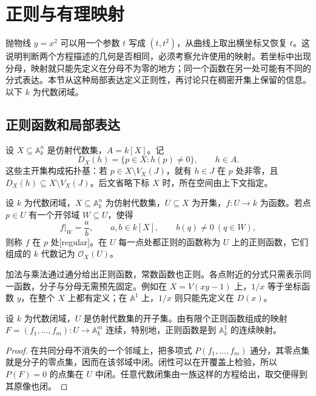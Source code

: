 
% 
% 

\section{正则与有理映射}
\label{g5:sec:0102}

抛物线 \(y=x^2\) 可以用一个参数 \(t\) 写成 \((t,t^2)\)，从曲线上取出横坐标又恢复 \(t\)。这说明判断两个方程描述的几何是否相同，必须考察允许使用的映射。若坐标中出现分母，映射就只能先定义在分母不为零的地方；同一个函数在另一处可能有不同的分式表达。本节从这种局部表达定义正则性，再讨论只在稠密开集上保留的信息。以下 \(k\) 为代数闭域。

\subsection{正则函数和局部表达}
\label{g5:subsec:0102:01}

设 \(X\subseteq\mathbb A_k^n\) 是仿射代数集，\(A=k[X]\)。记
\[
	D_X(h)=\{p\in X:h(p)\ne0\},\qquad h\in A.
\]
这些主开集构成拓扑基：若 \(p\in X\setminus V_X(J)\)，就有 \(h\in J\) 在 \(p\) 处非零，且 \(D_X(h)\subseteq X\setminus V_X(J)\)。后文省略下标 \(X\) 时，所在空间由上下文指定。

\begin{definition}\label{g5:def:regular-function}
	设 \(k\) 为代数闭域，\(X\subseteq\mathbb A_k^n\) 为仿射代数集，\(U\subseteq X\) 为开集，\(f:U\rightarrow k\) 为函数。若点 \(p\in U\) 有一个开邻域 \(W\subseteq U\)，使得
	\[
		f|_W=\frac ab,\qquad a,b\in k[X],\qquad b(q)\ne0\ (q\in W),
	\]
	则称 \(f\) 在 \(p\) 处[regular]。在 \(U\) 每一点处都正则的函数称为 \(U\) 上的正则函数，它们组成的 \(k\) 代数记为 \(\mathcal O_X(U)\)。
\end{definition}

加法与乘法通过通分给出正则函数，常数函数也正则。各点附近的分式只需表示同一函数，分子与分母无需预先固定。例如在 \(X=V(xy-1)\) 上，\(1/x\) 等于坐标函数 \(y\)，在整个 \(X\) 上都有定义；在 \(\mathbb A^1\) 上，\(1/x\) 则只能先定义在 \(D(x)\)。

\begin{proposition}\label{g5:prop:regular-continuous}
	设 \(k\) 为代数闭域，\(U\) 是仿射代数集的开子集。由有限个正则函数组成的映射 \(F=(f_1,\ldots,f_m):U\rightarrow\mathbb A_k^m\) 连续，特别地，正则函数是到 \(\mathbb A_k^1\) 的连续映射。
\end{proposition}
\begin{proof}
	在共同分母不消失的一个邻域上，把多项式 \(P(f_1,\ldots,f_m)\) 通分，其零点集就是分子的零点集，因而在该邻域中闭。闭性可以在开覆盖上检验，所以 \(P(F)=0\) 的点集在 \(U\) 中闭。任意代数闭集由一族这样的方程给出，取交便得到其原像也闭。
\end{proof}

